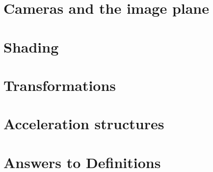 \documentclass{article}
\begin{document}




\section{Cameras and the image plane}
\label{sec:cameras}


\section{Shading}
\label{sec:shading}


\section{Transformations}
\label{sec:transform}


\section{Acceleration structures}
\label{sec:accel}



\section{Answers to Definitions}





\end{document}
